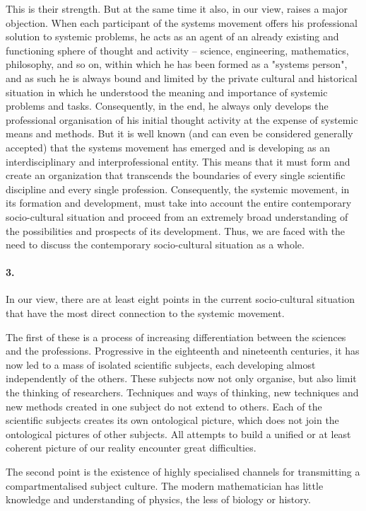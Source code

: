 \documentclass[11pt,a4paper]{article}
\begin{document}
This is their strength. But at the same time it also, in our view, raises a
major objection. When each participant of the systems movement offers his
professional solution to systemic problems, he acts as an agent of an already
existing and functioning sphere of thought and activity – science,
engineering, mathematics, philosophy, and so on, within which he has been
formed as a "systems person", and as such he is always bound and limited by
the private cultural and historical situation in which he understood the
meaning and importance of systemic problems and tasks. Consequently, in the
end, he always only develops the professional organisation of his initial
thought activity at the expense of systemic means and methods. But it is well
known (and can even be considered generally accepted) that the systems
movement has emerged and is developing as an interdisciplinary and
interprofessional entity. This means that it must form and create an
organization that transcends the boundaries of every single scientific
discipline and every single profession. Consequently, the systemic movement,
in its formation and development, must take into account the entire
contemporary socio-cultural situation and proceed from an extremely broad
understanding of the possibilities and prospects of its development. Thus, we
are faced with the need to discuss the contemporary socio-cultural situation
as a whole.

\paragraph{3.}
In our view, there are at least eight points in the current socio-cultural
situation that have the most direct connection to the systemic movement.

The first of these is a process of increasing differentiation between the
sciences and the professions. Progressive in the eighteenth and nineteenth
centuries, it has now led to a mass of isolated scientific subjects, each
developing almost independently of the others. These subjects now not only
organise, but also limit the thinking of researchers. Techniques and ways of
thinking, new techniques and new methods created in one subject do not extend
to others. Each of the scientific subjects creates its own ontological
picture, which does not join the ontological pictures of other subjects. All
attempts to build a unified or at least coherent picture of our reality
encounter great difficulties.

The second point is the existence of highly specialised channels for
transmitting a compartmentalised subject culture. The modern mathematician has
little knowledge and understanding of physics, the less of biology or history.
\end{document}
